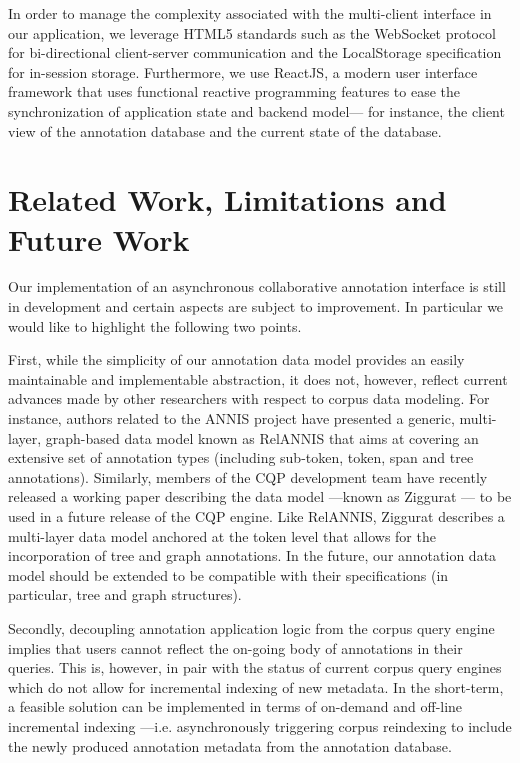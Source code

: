\documentclass{sig-alternate}
\begin{document}
In order to manage the complexity associated with the multi-client interface in our application,
we leverage HTML5 standards such as the WebSocket protocol for bi-directional client-server
communication and the LocalStorage specification for in-session storage. Furthermore, we use
ReactJS, a modern user interface framework that uses functional reactive programming features to
ease the synchronization of application state and backend model--- for instance, the
client view of the annotation database and the current state of the database.

\section{Related Work, Limitations and Future Work}\label{sec:future}
Our implementation of an asynchronous collaborative annotation interface is still in development
and certain aspects are subject to improvement. In particular we would like to highlight the
following two points.

First, while the simplicity of our annotation data model provides an easily maintainable and
implementable abstraction, it does not, however, reflect current advances made by other researchers
with respect to corpus data modeling. For instance, authors related to the ANNIS project have
presented a generic, multi-layer, graph-based data model known as RelANNIS \cite{Krause2016} that
aims at covering an extensive set of annotation types (including sub-token, token, span and
tree annotations). Similarly, members of the CQP development team have recently released a working
paper describing the data model ---known as Ziggurat \cite{Evert2015}--- to be
used in a future release of the CQP engine. Like RelANNIS, Ziggurat describes a multi-layer
data model anchored at the token level that allows for the incorporation of tree and graph
annotations. In the future, our annotation data model should be extended to be compatible with their
specifications (in particular, tree and graph structures).

Secondly, decoupling annotation application logic from the corpus query engine implies that
users cannot reflect the on-going body of annotations in their queries. This is, however, in
pair with the status of current corpus query engines which do not allow for incremental indexing of
new metadata. In the short-term, a feasible solution can be implemented in terms of
on-demand and off-line incremental indexing ---i.e. asynchronously triggering corpus
reindexing to include the newly produced annotation metadata from the annotation database.
\end{document}
